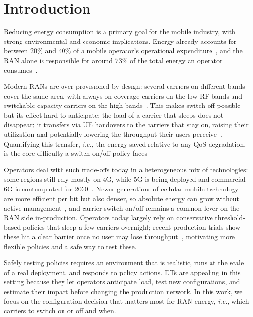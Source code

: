 \documentclass[sigconf, 10pt, anonymous, review]{acmart}
\newcommand{\ie}{\textit{i.e.},\xspace}
\begin{document}
\section{Introduction}
\label{sec:intro}
Reducing energy consumption is a primary goal for the mobile industry, with strong environmental and economic implications. 
Energy already accounts for between $20\%$ and $40\%$ of a mobile operator's operational expenditure~\cite{de2026advancing}, and the \ac{RAN} alone is responsible for around $73\%$ of the total energy an operator consumes~\cite{green2021going}. 

Modern \acp{RAN} are over-provisioned by design: several carriers on different bands cover the same area, with always-on coverage carriers on the low \ac{RF} bands and switchable capacity carriers on the high bands~\cite{survey_5g_energy_efficiency, user_transfer_5g}. 
This makes switch-off possible but its effect hard to anticipate: the load of a carrier that sleeps does not disappear; it transfers via \ac{UE} handovers to the carriers that stay on, raising their utilization and potentially lowering the throughput their users perceive~\cite{user_transfer_5g}. 
Quantifying this transfer, \ie the energy saved relative to any \ac{QoS} degradation, is the core difficulty a switch-on/off policy faces.

Operators deal with such trade-offs today in a heterogeneous mix of technologies: some regions still rely mostly on 4G, while 5G is being deployed and commercial 6G is contemplated for 2030~\cite{ericsson2025mobility}.
Newer generations of cellular mobile technology are more efficient per bit but also denser, so absolute energy can grow without active management~\cite{gsma20205g}, and carrier switch-on/off remains a common lever on the \ac{RAN} side in-production. 
Operators today largely rely on conservative threshold-based policies that sleep a few carriers overnight; recent production trials show these hit a clear barrier once no user may lose throughput~\cite{infocom_telf}, motivating more flexible policies and a safe way to test these.

Safely testing policies requires an environment that is realistic, runs at the scale of a real deployment, and responds to policy actions. 
\acfp{DT} are appealing in this setting because they let operators anticipate load, test new configurations, and estimate their impact before changing the production network. In this work, we focus on the configuration decision that matters most for \ac{RAN} energy, \ie which carriers to switch on or off and when.
\end{document}
